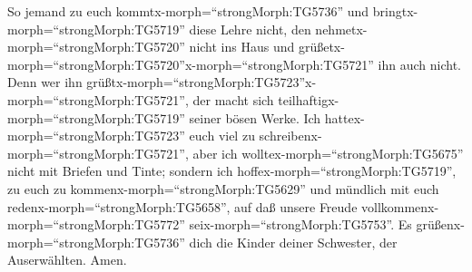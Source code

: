  So jemand zu euch kommtx-morph=``strongMorph:TG5736'' und
bringtx-morph=``strongMorph:TG5719'' diese Lehre nicht, den
nehmetx-morph=``strongMorph:TG5720'' nicht ins Haus und
grüßetx-morph=``strongMorph:TG5720''x-morph=``strongMorph:TG5721'' ihn
auch nicht.  Denn wer ihn
grüßtx-morph=``strongMorph:TG5723''x-morph=``strongMorph:TG5721'', der
macht sich teilhaftigx-morph=``strongMorph:TG5719'' seiner bösen Werke.
 Ich hattex-morph=``strongMorph:TG5723'' euch viel zu
schreibenx-morph=``strongMorph:TG5721'', aber ich
wolltex-morph=``strongMorph:TG5675'' nicht mit Briefen und Tinte;
sondern ich hoffex-morph=``strongMorph:TG5719'', zu euch zu
kommenx-morph=``strongMorph:TG5629'' und mündlich mit euch
redenx-morph=``strongMorph:TG5658'', auf daß unsere Freude
vollkommenx-morph=``strongMorph:TG5772''
seix-morph=``strongMorph:TG5753''.  Es
grüßenx-morph=``strongMorph:TG5736'' dich die Kinder deiner Schwester,
der Auserwählten. Amen.

